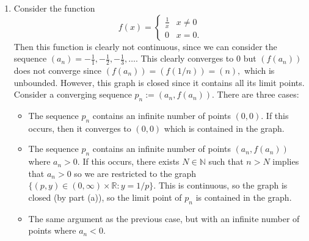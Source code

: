 \documentclass{article}
\numberwithin{equation}{section}
\begin{document}
\begin{enumerate}
\begin{enumerate}[label=(\alph*)]

        \item Consider the function
        \begin{equation}
            f(x) = \begin{cases}
                \frac{1}{x} & x \neq 0 \\ 
                0 & x = 0.
            \end{cases}
        \end{equation}
        Then this function is clearly not continuous, since we can consider the sequence $(a_n)=-\frac{1}{1},-\frac{1}{2},-\frac{1}{3},\dots.$ This clearly converges to $0$ but $(f(a_n))$ does not converge since $(f(a_n))=(f(1/n))=(n),$ which is unbounded. However, this graph is closed since it contains all its limit points. Consider a converging sequence $p_n:=(a_n,f(a_n)).$ There are three cases:
        \begin{itemize}
            \item The sequence $p_n$ contains an infinite number of points $(0,0).$ If this occurs, then it converges to $(0,0)$ which is contained in the graph.
            \item The sequence $p_n$ contains an infinite number of points $(a_n,f(a_n))$ where $a_n>0.$ If this occurs, there exists $N\in \mathbb{N}$ such that $n>N$ implies that $a_n>0$ so we are restricted to the graph $\{(p,y)\in (0,\infty)\times \mathbb{R}:y=1/p\}.$ This is continuous, so the graph is closed (by part (a)), so the limit point of $p_n$ is contained in the graph.
            \item The same argument as the previous case, but with an infinite number of points where $a_n<0.$

\end{itemize}
\end{enumerate}
\end{enumerate}
\end{document}
